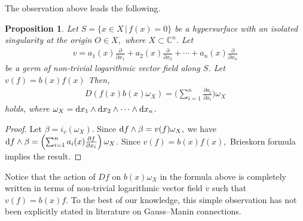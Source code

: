 \documentclass[10pt,a4paper]{amsart}
\numberwithin{equation}{section}
\newtheorem{Proposition}[Theorem]{Proposition}
 { \theoremstyle{definition}
\newtheorem{Definition}[Theorem]{Definition}
\newtheorem{Remark}[Theorem]{Remark}
\newtheorem{Example}[Theorem]{Example}
 }
\begin{document}
The observation above leads the following.

\begin{Proposition}\label{pro5}
Let $ S=\{x \in X \,|\, f(x)=0 \} $ be a hypersurface with an isolated singularity at the origin $O \in X, $ where $ X \subset {\mathbb C}^n$. Let
\begin{gather*}
v=a_1(x)\frac{\partial}{\partial x_1} + a_2(x)\frac{\partial}{\partial x_2}+ \cdots +a_n(x)\frac{\partial}{\partial x_n}
\end{gather*}
be a germ of non-trivial logarithmic vector field along $S$.
 Let
$ v(f) = b(x)f(x) $
Then,
\begin{gather*}
D(f(x)b(x)\omega_X) = \Bigg( \sum_{i=1}^{n} \frac{\partial a_i}{\partial x_i} \Bigg) \omega_X
\end{gather*}
holds, where $ \omega_X={\rm d}x_1 \wedge {\rm d}x_2 \wedge \cdots \wedge {\rm d}x_n$.
\end{Proposition}
\begin{proof}
Let $ \beta=i_v(\omega_X)$.
Since $ {\rm d}f\wedge \beta = v(f) \omega_X, $ we have $ {\rm d}f\wedge \beta = \left( \sum_{i=1}^{n} a_i(x)\frac{\partial f}{\partial x_i} \right)\omega_X$. Since $ v(f) =b(x)f(x), $ Brieskorn formula implies the result.
\end{proof}


Notice that the action of $Df $ on $ b(x)\omega_X $ in the formula above is completely written in terms of non-trivial logarithmic vector field
$v$ such that $ v(f)=b(x)f$.
To the best of our knowledge, this simple observation has not been explicitly stated in literature on Gauss--Manin connections.


\end{document}
